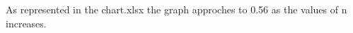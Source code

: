\documentclass[12pt]{article}
\begin{document}
As represented in the chart.xlsx the graph approches to 0.56 as the values of n
increases.
\end{document}
